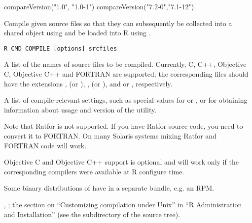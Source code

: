 %
\begin{Examples}
\begin{ExampleCode}
compareVersion("1.0", "1.0-1")
compareVersion("7.2-0","7.1-12")
\end{ExampleCode}
\end{Examples}
%
\begin{Description}\relax
Compile given source files so that they can subsequently be collected
into a shared object using  and be loaded into R
using .
\end{Description}
%
\begin{Usage}
\begin{verbatim}
R CMD COMPILE [options] srcfiles
\end{verbatim}
\end{Usage}
%
\begin{Arguments}
\begin{ldescription}
\item[\code{srcfiles}] A list of the names of source files to be compiled.
Currently, C, C++, Objective C, Objective C++ and FORTRAN are
supported; the corresponding files should have the extensions
,  (or ), ,
 (or ),  and  or ,
respectively.
\item[\code{options}] A list of compile-relevant settings, such as special
values for  or , or for obtaining
information about usage and version of the utility.
\end{ldescription}
\end{Arguments}
%
\begin{Details}\relax
Note that Ratfor is not supported.  If you have Ratfor source code,
you need to convert it to FORTRAN.  On many Solaris systems mixing
Ratfor and FORTRAN code will work.

Objective C and Objective C++ support is optional and will work only
if the corresponding compilers were available at R configure time.
\end{Details}
%
\begin{Note}\relax
Some binary distributions of \R{} have  in a separate
bundle, e.g. an  RPM.
\end{Note}
%
\begin{SeeAlso}\relax
{},
;
the section on ``Customizing compilation under Unix'' in
``R Administration and Installation''
(see the  subdirectory of the \R{} source tree).  
\end{SeeAlso}
